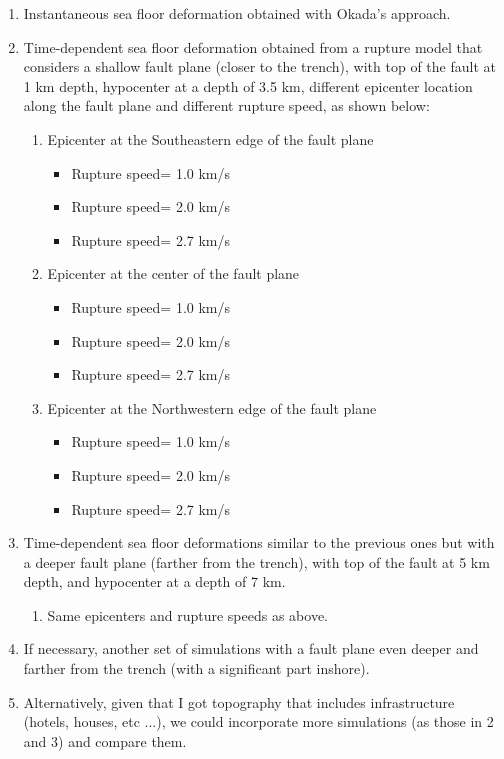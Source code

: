 \documentclass[preprint,review,12pt]{elsarticle}
\begin{document}
\begin{enumerate}
  \item Instantaneous sea floor deformation obtained with Okada's approach.
  \item Time-dependent sea floor deformation obtained from a rupture model that considers a shallow fault plane (closer to the trench), with top of the fault at 1 km depth, hypocenter at a depth of 3.5 km, different epicenter location along the fault plane and different rupture speed, as shown below:

  \begin{enumerate}
    \item Epicenter at the Southeastern edge of the fault plane
    \begin{itemize}
      \item Rupture speed= 1.0 km/s 
      \item Rupture speed= 2.0 km/s 
      \item Rupture speed= 2.7 km/s 
    \end{itemize}

    \item Epicenter at the center of the fault plane
    \begin{itemize}
      \item Rupture speed= 1.0 km/s 
      \item Rupture speed= 2.0 km/s 
      \item Rupture speed= 2.7 km/s 
    \end{itemize}

    \item Epicenter at the Northwestern edge of the fault plane
    \begin{itemize}
      \item Rupture speed= 1.0 km/s 
      \item Rupture speed= 2.0 km/s 
      \item Rupture speed= 2.7 km/s 
    \end{itemize}
\end{enumerate}

  \item Time-dependent sea floor deformations similar to the previous ones but with a deeper fault plane (farther from the trench), with top of the fault at 5 km depth, and hypocenter at a depth of 7 km.

  \begin{enumerate}
   \item Same epicenters and rupture speeds as above.
  \end{enumerate}

   \item If necessary, another set of simulations with a fault plane even deeper and farther from the trench (with a significant part inshore). 

  \item Alternatively, given that I got topography that includes infrastructure (hotels, houses, etc ...), we could incorporate more simulations (as those in 2 and 3) and compare them.
\end{enumerate}
\end{document}
